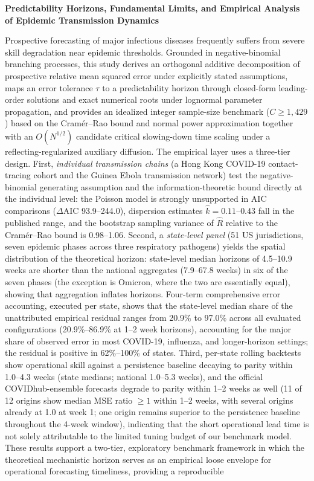 \documentclass[11pt,a4paper]{article}
\theoremstyle{plain}
\theoremstyle{definition}
\begin{document}
\clearpage
\begin{center}
    {\heiti\bfseries Predictability Horizons, Fundamental Limits, and Empirical Analysis of Epidemic Transmission Dynamics} \\[1.0em]
\end{center}

 Prospective forecasting of major infectious diseases frequently suffers from severe skill degradation near epidemic thresholds. Grounded in negative-binomial branching processes, this study derives an orthogonal additive decomposition of prospective relative mean squared error under explicitly stated assumptions, maps an error tolerance $\tau$ to a predictability horizon through closed-form leading-order solutions and exact numerical roots under lognormal parameter propagation, and provides an idealized integer sample-size benchmark ($C \ge 1{,}429$) based on the Cram\'er--Rao bound and normal power approximation together with an $O(N^{1/2})$ candidate critical slowing-down time scaling under a reflecting-regularized auxiliary diffusion. The empirical layer uses a three-tier design. First, \emph{individual transmission chains} (a Hong Kong COVID-19 contact-tracing cohort and the Guinea Ebola transmission network) test the negative-binomial generating assumption and the information-theoretic bound directly at the individual level: the Poisson model is strongly unsupported in AIC comparisons ($\Delta\text{AIC}$ 93.9--244.0), dispersion estimates $\hat{k}=0.11$--$0.43$ fall in the published range, and the bootstrap sampling variance of $\hat{R}$ relative to the Cram\'er--Rao bound is 0.98--1.06. Second, a \emph{state-level panel} (51 US jurisdictions, seven epidemic phases across three respiratory pathogens) yields the spatial distribution of the theoretical horizon: state-level median horizons of 4.5--10.9 weeks are shorter than the national aggregates (7.9--67.8 weeks) in six of the seven phases (the exception is Omicron, where the two are essentially equal), showing that aggregation inflates horizons. Four-term comprehensive error accounting, executed per state, shows that the state-level median share of the unattributed empirical residual ranges from 20.9\% to 97.0\% across all evaluated configurations (20.9\%--86.9\% at 1--2 week horizons), accounting for the major share of observed error in most COVID-19, influenza, and longer-horizon settings; the residual is positive in 62\%--100\% of states. Third, per-state rolling backtests show operational skill against a persistence baseline decaying to parity within 1.0--4.3 weeks (state medians; national 1.0--5.3 weeks), and the official COVIDhub-ensemble forecasts degrade to parity within 1--2 weeks as well (11 of 12 origins show median MSE ratio $\ge 1$ within 1--2 weeks, with several origins already at 1.0 at week 1; one origin remains superior to the persistence baseline throughout the 4-week window), indicating that the short operational lead time is not solely attributable to the limited tuning budget of our benchmark model. These results support a two-tier, exploratory benchmark framework in which the theoretical mechanistic horizon serves as an empirical loose envelope for operational forecasting timeliness, providing a reproducible 
\end{document}
